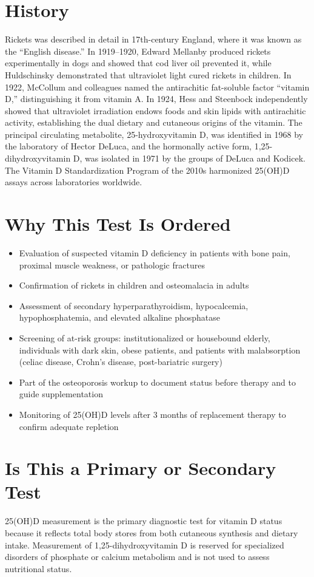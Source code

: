 \section*{History}
Rickets was described in detail in 17th-century England, where it was known as the ``English disease.'' In 1919--1920, Edward Mellanby produced rickets experimentally in dogs and showed that cod liver oil prevented it, while Huldschinsky demonstrated that ultraviolet light cured rickets in children. In 1922, McCollum and colleagues named the antirachitic fat-soluble factor ``vitamin D,'' distinguishing it from vitamin A. In 1924, Hess and Steenbock independently showed that ultraviolet irradiation endows foods and skin lipids with antirachitic activity, establishing the dual dietary and cutaneous origins of the vitamin. The principal circulating metabolite, 25-hydroxyvitamin D, was identified in 1968 by the laboratory of Hector DeLuca, and the hormonally active form, 1,25-dihydroxyvitamin D, was isolated in 1971 by the groups of DeLuca and Kodicek. The Vitamin D Standardization Program of the 2010s harmonized 25(OH)D assays across laboratories worldwide.
\section*{Why This Test Is Ordered}
\begin{itemize}
  \item Evaluation of suspected vitamin D deficiency in patients with bone pain, proximal muscle weakness, or pathologic fractures
  \item Confirmation of rickets in children and osteomalacia in adults
  \item Assessment of secondary hyperparathyroidism, hypocalcemia, hypophosphatemia, and elevated alkaline phosphatase
  \item Screening of at-risk groups: institutionalized or housebound elderly, individuals with dark skin, obese patients, and patients with malabsorption (celiac disease, Crohn's disease, post-bariatric surgery)
  \item Part of the osteoporosis workup to document status before therapy and to guide supplementation
  \item Monitoring of 25(OH)D levels after 3 months of replacement therapy to confirm adequate repletion
\end{itemize}
\section*{Is This a Primary or Secondary Test}
25(OH)D measurement is the primary diagnostic test for vitamin D status because it reflects total body stores from both cutaneous synthesis and dietary intake. Measurement of 1,25-dihydroxyvitamin D is reserved for specialized disorders of phosphate or calcium metabolism and is not used to assess nutritional status.
